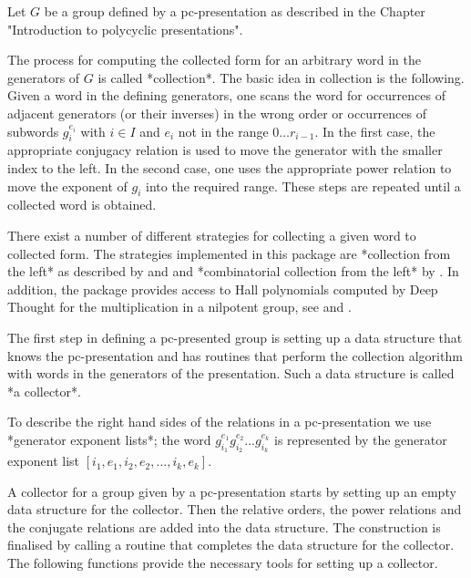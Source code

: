 
Let $G$ be a group defined by a pc-presentation as described in the
Chapter "Introduction to polycyclic presentations".

The process for computing the collected form for an arbitrary word in
the generators of $G$ is called *collection*.  The basic idea in
collection is the following.  Given a word in the defining generators,
one scans the word for occurrences of adjacent generators (or their
inverses) in the wrong order or occurrences of subwords $g_i^{e_i}$
with $i\in I$ and $e_i$ not in the range $0\ldots r_{i-1}$.  In the
first case, the appropriate conjugacy relation is used to move the
generator with the smaller index to the left.  In the second case, one
uses the appropriate power relation to move the exponent of $g_i$ into
the required range.  These steps are repeated until a collected word
is obtained.

There exist a number of different strategies for collecting a given
word to collected form.  The strategies implemented in this package
are *collection from the left* as described by \cite{LGS90} and
\cite{Sims94} and *combinatorial collection from the left* by
\cite{MVL90}.  In addition, the package provides access to Hall
polynomials computed by Deep Thought for the multiplication in a
nilpotent group, see \cite{WWM97} and \cite{LGS98}.

The first step in defining a pc-presented group is setting up a data
structure that knows the pc-presentation and has routines that perform
the collection algorithm with words in the generators of the
presentation. Such a data structure is called *a collector*.

To describe the right hand sides of the relations in a pc-presentation
we use *generator exponent lists*; the word
$g_{i_1}^{e_1}g_{i_2}^{e_2}\ldots g_{i_k}^{e_k}$ is represented by the
generator exponent list $[i_1,e_1,i_2,e_2,\ldots,i_k,e_k]$.


A collector for a group given by a pc-presentation starts by
setting up an empty data structure for the collector.  Then the
relative orders, the power relations and the conjugate relations are
added into the data structure.  The construction is finalised by
calling a routine that completes the data structure for the
collector.  The following functions provide the necessary tools for
setting up a collector.


